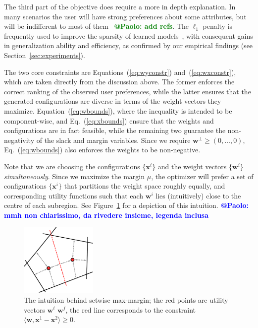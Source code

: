 \documentclass{article}
\renewcommand\[{\begin{equation}}
\renewcommand\]{\end{equation}}
\newcommand{\vecvar}[1]{\ensuremath{\boldsymbol{#1}}}
\newcommand{\vw}{\vecvar{w}}
\newcommand{\vx}{\vecvar{x}}
\newcommand{\andrea}[1]{{\bf \textcolor{blue}{{\fbox{Andrea:} #1}}}}
\newcommand{\stefano}[1]{{\bf \textcolor{green}{{\fbox{Stefano:} #1}}}}
\begin{document}
The third part of the objective does require a more in depth explanation. In
many scenarios the user will have strong preferences about some attributes, but
will be indifferent to most of them~\cite{} \stefano{@Paolo: add refs}. The $\ell_1$ penalty is frequently
used to improve the sparsity of learned models~\cite{lasso,zhang2008,Hensinger2010}, with consequent gains
in generalization ability and efficiency, as confirmed by our empirical
findings (see Section~\ref{sec:experiments}).

The two core constraints are Equations~(\ref{eq:wyconstr}) and~(\ref{eq:wxconstr}),
which are taken directly from the discussion above. The former enforces the
correct ranking of the observed user preferences, while the latter ensures that
the generated configurations are diverse in terms of the weight vectors they
maximize. Equation~(\ref{eq:wbounds}), where the inequality is intended to be component-wise, and Eq.~(\ref{eq:xbounds})
ensure that the weights and configurations are in fact feasible, while the
remaining two guarantee the non-negativity of the slack and margin variables.
Since we require $\vw^\bot \ge (0,\ldots,0)$, Eq.~(\ref{eq:wbounds}) also enforces the weights to be non-negative.

Note that we are choosing the configurations $\{ \vx^i \}$ and the weight vectors $\{
\vw^i \}$ {\em simultaneously}. Since we maximize the margin $\mu$, the optimizer
will prefer a set of configurations $\{ \vx^{i} \}$ that partitions the weight space
roughly equally, and corresponding utility functions such that each $\vw^{i}$
lies (intuitively) close to the centre of each subregion. See
Figure~\ref{fig:setmargin} for a depiction of this intuition.\andrea{@Paolo: mmh non chiarissimo, da rivedere insieme, legenda inclusa}

\begin{figure}[t]
    \begin{center}
        \includegraphics[width=10em]{figures/setmargin}
    \end{center}
    \caption{\label{fig:setmargin} The intuition behind setwise max-margin; the red points are utility vectors $\vw^{i}$ $\vw^{j}$, the red line corresponds to the constraint $\langle \vw, \vx^{1} - \vx^{2} \rangle \ge 0$.}
\end{figure}
\end{document}

